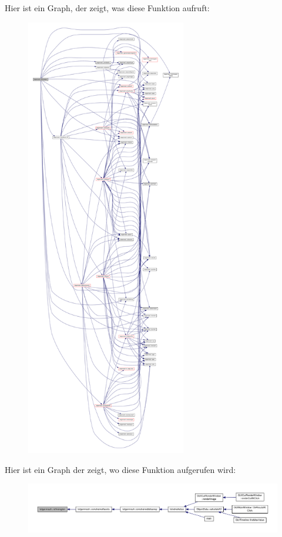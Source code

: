 Hier ist ein Graph, der zeigt, was diese Funktion aufruft\-:\nopagebreak
\begin{figure}[H]
\begin{center}
\leavevmode
\includegraphics[height=550pt]{classtetgenmesh_aa34a5188a4cee82197394560c388c348_cgraph}
\end{center}
\end{figure}




Hier ist ein Graph der zeigt, wo diese Funktion aufgerufen wird\-:\nopagebreak
\begin{figure}[H]
\begin{center}
\leavevmode
\includegraphics[width=350pt]{classtetgenmesh_aa34a5188a4cee82197394560c388c348_icgraph}
\end{center}
\end{figure}


